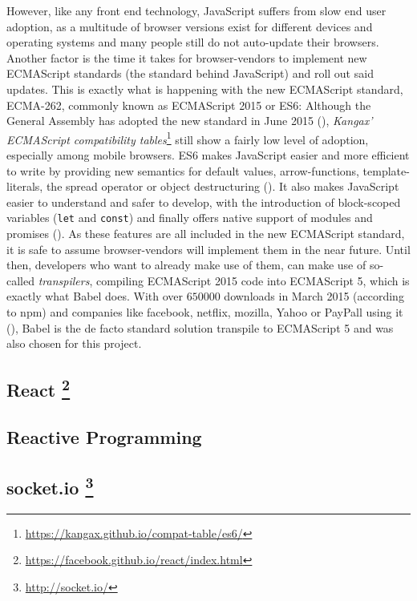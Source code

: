 However, like any front end technology, JavaScript suffers from slow end user adoption, as a multitude of browser versions exist for different devices and operating systems and many people still do not auto-update their browsers. Another factor is the time it takes for browser-vendors to implement new ECMAScript standards (the standard behind JavaScript) and roll out said updates. This is exactly what is happening with the new ECMAScript standard, ECMA-262, commonly known as ECMAScript 2015 or ES6: Although the General Assembly has adopted the new standard in June 2015 (\cite{ecma2015}), \emph{Kangax' ECMAScript compatibility tables}\footnote{\url{https://kangax.github.io/compat-table/es6/}} still show a fairly low level of adoption, especially among mobile browsers. ES6 makes JavaScript easier and more efficient to write by providing new semantics for default values, arrow-functions, template-literals, the spread operator or object destructuring (\cite{es6}). It also makes JavaScript easier to understand and safer to develop, with the introduction of block-scoped variables (\texttt{let} and \texttt{const}) and finally offers native support of modules and promises (\cite{es6}).
As these features are all included in the new ECMAScript standard, it is safe to assume browser-vendors will implement them in the near future. Until then, developers who want to already make use of them, can make use of so-called \emph{transpilers}, compiling ECMAScript 2015 code into ECMAScript 5, which is exactly what Babel does. With over $650000$ downloads in March 2015 (according to npm) and companies like facebook, netflix, mozilla, Yahoo or PayPall using it (\cite{babel-users}), Babel is the de facto standard solution transpile to ECMAScript 5 and was also chosen for this project.

\subsection[React]%
             {React%
             \protect\footnote{\url{https://facebook.github.io/react/index.html}}}%
\label{sec:implementation-architecture-react}

\subsection{Reactive Programming}
\label{sec:implementation-architecture-rxjs}

\subsection[socket.io]%
             {socket.io%
             \protect\footnote{\url{http://socket.io/}}}%
\label{sec:implementation-architecture-socketio}


